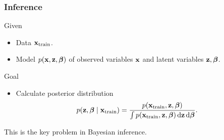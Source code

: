 \documentclass[10pt,
               xcolor={usenames,dvipsnames},
               hyperref={colorlinks,linktoc=all,citecolor=Plum,linkcolor=MidnightBlue,urlcolor=MidnightBlue},noamssymb]{beamer}
\begin{document}
\begin{frame}
\frametitle{Inference}
Given
\begin{itemize}
\item Data $\mbx_{\text{train}}$.
\item
Model $p(\mbx, \mbz, \mbbeta)$ of
observed variables $\mbx$ and latent variables $\mbz, \mbbeta$.
\end{itemize}
Goal
\begin{itemize}
\item
Calculate posterior distribution
\begin{equation*}
p(\mbz, \mbbeta\mid\mbx_{\text{train}}) =
\frac{p(\mbx_{\text{train}}, \mbz, \mbbeta)}{\int
p(\mbx_{\text{train}}, \mbz, \mbbeta) \d\mbz\d\mbbeta}.
\end{equation*}
\end{itemize}
\vspace{2ex}
This is the key problem in Bayesian inference.
\end{frame}
\end{document}
